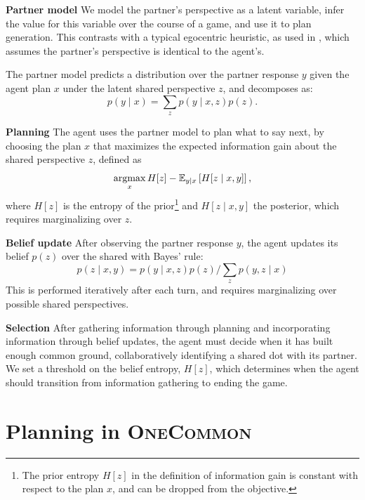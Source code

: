 \documentclass[11pt]{article}
\newcommand{\daniel}[1]{{{\textcolor{brown}{(Daniel: #1)}}}}
\begin{document}
\noindent \textbf{Partner model}
We model the partner's perspective as a latent variable, infer the value for this variable over the course of a game, and use it to plan generation.
This contrasts with a typical egocentric heuristic, as used in \citet{fried}, which assumes the partner's perspective
is identical to the agent's.

The partner model predicts a distribution over the partner response $y$ given the agent plan $x$ under the latent shared perspective $z$, and decomposes as:
$$p(y \mid x) = \sum_z p(y \mid x,z)p(z).$$


\noindent  \textbf{Planning}
The agent uses the partner model to plan
what to say next, by choosing
the plan $x$ that maximizes the expected information gain  \citep{lindley} about the shared perspective $z$,
defined as
$$\operatorname*{argmax}_x H[z] - \mathbb{E}_{y \mid x}\left[H[z \mid x,y]\right],$$
where $H[z]$ is the entropy of the prior\footnote{The prior entropy $H[z]$ in the definition of information gain is constant with respect to
the plan $x$, and can be dropped from the objective.}
 and $H[z\mid x,y]$ the posterior,
which requires marginalizing over $z$.


\noindent \textbf{Belief update}
After observing the partner response $y$, the agent updates its belief $p(z)$ over the shared
with Bayes' rule:
$$p(z \mid x, y) = p(y \mid x,z)p(z) / \sum_z p(y,z \mid x)$$
This is performed iteratively after each turn,
and requires marginalizing over possible shared perspectives.

\noindent \textbf{Selection}
After gathering information through planning and
incorporating information through belief updates,
the agent must decide when it has built enough common ground, collaboratively identifying a shared dot with its partner.
We set a threshold on the belief entropy, $H[z]$,
which determines when the agent should transition
from information gathering to ending the game.

\section{Planning in \textsc{OneCommon}}
\label{sec:plan-oc}
\end{document}
